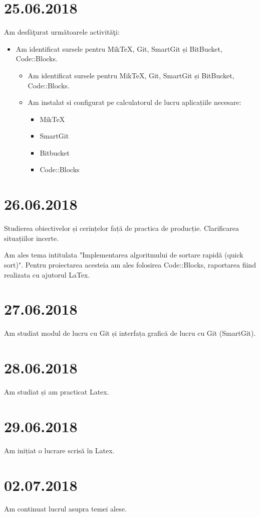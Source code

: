 \documentclass{report}
\begin{document}
\chapter{25.06.2018}
Am desfăţurat următoarele activităţi:
\begin{itemize}
\item
Am identificat sursele pentru MikTeX, Git, SmartGit și BitBucket, Code::Blocks.
\begin{itemize}
\item
Am identificat sursele pentru MikTeX, Git, SmartGit și BitBucket, Code::Blocks.
\item
Am instalat si configurat pe calculatorul de lucru aplicațiile necesare:
\begin{itemize}
\item
MikTeX
\item
SmartGit
\item
Bitbucket
\item
Code::Blocks
\end{itemize}
\end{itemize}
\end{itemize}

\chapter{26.06.2018}
Studierea obiectivelor și cerințelor față de practica de producție. Clarificarea situațiilor incerte.

\vskip 1cm

Am ales tema intitulata "Implementarea algoritmului de sortare rapidă (quick sort)". Pentru proiectarea acesteia am ales folosirea Code::Blocks, raportarea fiind realizata cu ajutorul LaTex.

\chapter{27.06.2018}
Am studiat modul de lucru cu Git și interfața grafică de lucru cu Git (SmartGit).
\chapter{28.06.2018}
Am studiat și am practicat Latex.
\chapter{29.06.2018}
Am inițiat o lucrare scrisă în Latex.
\chapter{02.07.2018}
Am continuat lucrul asupra temei alese.
\end{document}
